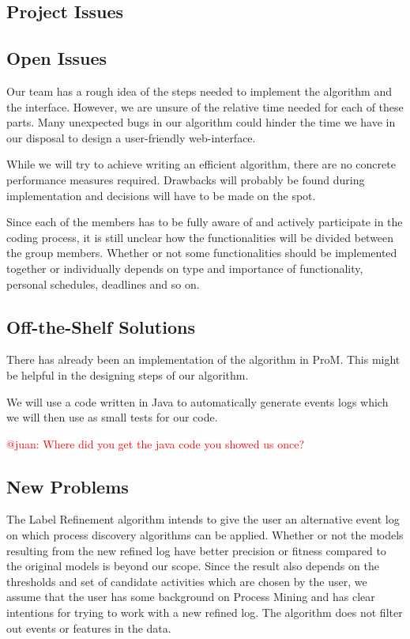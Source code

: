 \documentclass[notitlepage]{article}
\begin{document}
\begin{flushleft}
\section{Project Issues}

\subsection{Open Issues}
Our team has a rough idea of the steps needed to implement the algorithm and the interface.
However, we are unsure of the relative time needed for each of these parts.
Many unexpected bugs in our algorithm could hinder the time we have in our disposal to design a user-friendly web-interface.

While we will try to achieve writing an efficient algorithm, there are no concrete performance measures required.
Drawbacks will probably be found during implementation and decisions will have to be made on the spot.

Since each of the members has to be fully aware of and actively participate in the coding process, it is still unclear how the functionalities will be divided between the group members.
Whether or not some functionalities should be implemented together or individually depends on type and importance of functionality, personal schedules, deadlines and so on.






\subsection{Off-the-Shelf Solutions}
There has already been an implementation of the algorithm in ProM.
This might be helpful in the designing steps of our algorithm.

We will use a code written in Java to automatically generate events logs which we will then use as small tests for our code.

\textcolor{red}{@juan: Where did you get the java code you showed us once?}

\subsection{New Problems}
The Label Refinement algorithm intends to give the user an alternative event log on which process discovery algorithms can be applied.
Whether or not the models resulting from the new refined log have better precision or fitness compared to the original models is beyond our scope.
Since the result also depends on the thresholds and set of candidate activities which are chosen by the user, we assume that the user has some background on Process Mining and has clear intentions for trying to work with a new refined log.
The algorithm does not filter out events or features in the data.


\end{flushleft}
\end{document}
